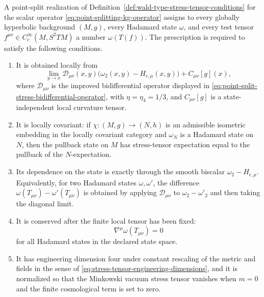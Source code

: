 \begin{definition}
\label{def:point-split-stress-tensor-prescription}
A point-split realization of
Definition~\ref{def:wald-type-stress-tensor-conditions} for the scalar
operator
\eqref{eq:point-splitting-kg-operator} assigns to every globally hyperbolic
background \((M,g)\), every Hadamard state \(\omega\), and every test tensor
\(f^{\mu\nu}\in C_c^\infty(M,S^2TM)\) a number
\(\omega(T(f))\).  The prescription is required to satisfy the following
conditions.

\begin{enumerate}
\item It is obtained locally from
\begin{equation}
  \lim_{y\to x}\mathcal D_{\mu\nu}(x,y)
  \bigl(\omega_2(x,y)-H_{\epsilon,\mu}(x,y)\bigr)
  +C_{\mu\nu}[g](x),
  \label{eq:point-splitting-prescription-template}
\end{equation}
where \(\mathcal D_{\mu\nu}\) is the improved bidifferential operator
displayed in
\eqref{eq:point-split-stress-bidifferential-operator}, with
\(\eta=\eta_4=1/3\), and \(C_{\mu\nu}[g]\) is a state-independent local
curvature tensor.
\item It is locally covariant: if \(\chi:(M,g)\to(N,h)\) is an admissible
isometric embedding in the locally covariant category and
\(\omega_N\) is a Hadamard state on \(N\), then the pullback state on \(M\)
has stress-tensor expectation equal to the pullback of the \(N\)-expectation.
\item Its dependence on the state is exactly through the smooth biscalar
\(\omega_2-H_{\epsilon,\mu}\).  Equivalently, for two Hadamard states
\(\omega,\omega'\), the difference
\(\omega(T_{\mu\nu})-\omega'(T_{\mu\nu})\) is obtained by applying
\(\mathcal D_{\mu\nu}\) to \(\omega_2-\omega'_2\) and then taking the
diagonal limit.
\item It is conserved after the finite local tensor has been fixed:
\begin{equation}
  \nabla^\mu\omega(T_{\mu\nu})=0
  \label{eq:point-splitting-stress-conservation-condition}
\end{equation}
for all Hadamard states in the declared state space.
\item It has engineering dimension four under constant rescaling of the
metric and fields in the sense of
\eqref{eq:stress-tensor-engineering-dimensions}, and it is normalized so
that the Minkowski vacuum stress tensor vanishes when \(m=0\) and the finite
cosmological term is set to zero.
\end{enumerate}
\end{definition}

